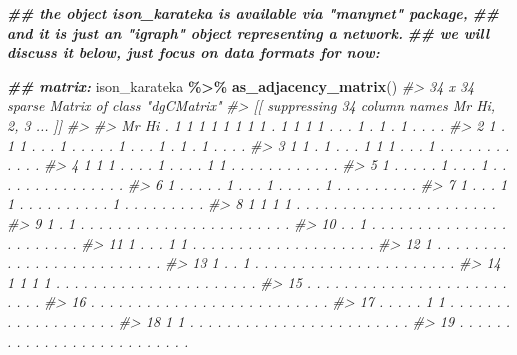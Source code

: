 \documentclass[
]{book}
\newenvironment{Shaded}{\begin{snugshade}}{\end{snugshade}}
\newcommand{\CommentTok}[1]{\textcolor[rgb]{0.56,0.35,0.01}{\textit{#1}}}
\newcommand{\DocumentationTok}[1]{\textcolor[rgb]{0.56,0.35,0.01}{\textbf{\textit{#1}}}}
\newcommand{\FunctionTok}[1]{\textcolor[rgb]{0.13,0.29,0.53}{\textbf{#1}}}
\newcommand{\NormalTok}[1]{#1}
\newcommand{\SpecialCharTok}[1]{\textcolor[rgb]{0.81,0.36,0.00}{\textbf{#1}}}
\begin{document}
\begin{Shaded}
\begin{Highlighting}[]
\DocumentationTok{\#\# the object \textasciigrave{}ison\_karateka\textasciigrave{} is available via "manynet" package,}
\DocumentationTok{\#\# and it is just an "igraph" object representing a network.}
\DocumentationTok{\#\# we will discuss it below, just focus on data formats for now:}

\DocumentationTok{\#\# matrix:}
\NormalTok{ison\_karateka }\SpecialCharTok{\%\textgreater{}\%} 
  \FunctionTok{as\_adjacency\_matrix}\NormalTok{()}
\CommentTok{\#\textgreater{} 34 x 34 sparse Matrix of class "dgCMatrix"}
\CommentTok{\#\textgreater{}   [[ suppressing 34 column names \textquotesingle{}Mr Hi\textquotesingle{}, \textquotesingle{}2\textquotesingle{}, \textquotesingle{}3\textquotesingle{} ... ]]}
\CommentTok{\#\textgreater{}                                                           }
\CommentTok{\#\textgreater{} Mr Hi  . 1 1 1 1 1 1 1 1 . 1 1 1 1 . . . 1 . 1 . 1 . . . .}
\CommentTok{\#\textgreater{} 2      1 . 1 1 . . . 1 . . . . . 1 . . . 1 . 1 . 1 . . . .}
\CommentTok{\#\textgreater{} 3      1 1 . 1 . . . 1 1 1 . . . 1 . . . . . . . . . . . .}
\CommentTok{\#\textgreater{} 4      1 1 1 . . . . 1 . . . . 1 1 . . . . . . . . . . . .}
\CommentTok{\#\textgreater{} 5      1 . . . . . 1 . . . 1 . . . . . . . . . . . . . . .}
\CommentTok{\#\textgreater{} 6      1 . . . . . 1 . . . 1 . . . . . 1 . . . . . . . . .}
\CommentTok{\#\textgreater{} 7      1 . . . 1 1 . . . . . . . . . . 1 . . . . . . . . .}
\CommentTok{\#\textgreater{} 8      1 1 1 1 . . . . . . . . . . . . . . . . . . . . . .}
\CommentTok{\#\textgreater{} 9      1 . 1 . . . . . . . . . . . . . . . . . . . . . . .}
\CommentTok{\#\textgreater{} 10     . . 1 . . . . . . . . . . . . . . . . . . . . . . .}
\CommentTok{\#\textgreater{} 11     1 . . . 1 1 . . . . . . . . . . . . . . . . . . . .}
\CommentTok{\#\textgreater{} 12     1 . . . . . . . . . . . . . . . . . . . . . . . . .}
\CommentTok{\#\textgreater{} 13     1 . . 1 . . . . . . . . . . . . . . . . . . . . . .}
\CommentTok{\#\textgreater{} 14     1 1 1 1 . . . . . . . . . . . . . . . . . . . . . .}
\CommentTok{\#\textgreater{} 15     . . . . . . . . . . . . . . . . . . . . . . . . . .}
\CommentTok{\#\textgreater{} 16     . . . . . . . . . . . . . . . . . . . . . . . . . .}
\CommentTok{\#\textgreater{} 17     . . . . . 1 1 . . . . . . . . . . . . . . . . . . .}
\CommentTok{\#\textgreater{} 18     1 1 . . . . . . . . . . . . . . . . . . . . . . . .}
\CommentTok{\#\textgreater{} 19     . . . . . . . . . . . . . . . . . . . . . . . . . .}

\end{Highlighting}
\end{Shaded}
\end{document}
